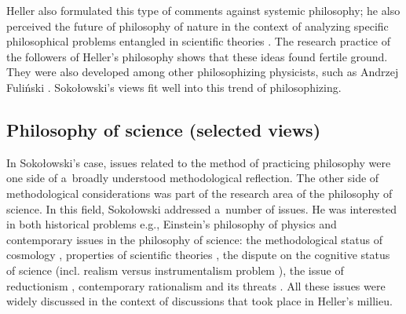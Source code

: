 \documentclass[%
  manuscript=article,
  year=2024,
  volume=77,
  doi=10.59203/zfn.77.689,
]{zfn}
\begin{document}
Heller also formulated this type of comments against systemic philosophy; he also perceived the future of philosophy of nature in the context of analyzing specific philosophical problems entangled in scientific theories 
\parencites[][]{Heller1986Jak}[][]{Heller1990Nowa}. %
 The research practice of the followers of Heller's philosophy shows that these ideas found fertile ground. They were also developed among other philosophizing physicists, such as Andrzej Fuliński 
\parencite[][]{Trombik2023Andrzej}. %
 Sokołowski's views fit well into this trend of philosophizing.



\subsection{ Philosophy of science (selected views)}



In Sokołowski's case, issues related to the method of practicing philosophy were one side of a~broadly understood methodological reflection. The other side of methodological considerations was part of the research area of the philosophy of science. In this field, Sokołowski addressed a~number of issues. He was interested in both historical problems e.g., Einstein's philosophy of physics
\parencites[see e.g.,][]{Sokoowski1987Alberta}[][]{Sokoowski1987Mysl1}[][]{Sokoowski1987Mysl2} %
 and contemporary issues in the philosophy of science: the methodological status of cosmology 
\parencites[][]{Sokoowski1978Czy}[][]{Sokoowski2015Granice}, %
 properties of scientific theories 
\parencites[][]{Sokoowski2006Teorie}[][]{Sokoowski2007Czowiek}, %
 the dispute on the cognitive status of science (incl. realism versus instrumentalism problem
\parencite[][]{Sokoowski1986Pluralizm}%
), the issue of reductionism 
\parencites[][]{Sokoowski1996W}[][]{Sokoowski1999Maa}[][]{Sokoowski2006Teorie}, %
 contemporary rationalism and its threats 
\parencites[][]{Sokoowski2001Wspoczesne}[][]{Sokoowski2006Alicja}. %
 All these issues were widely discussed in the context of discussions that took place in Heller's millieu.
\end{document}

